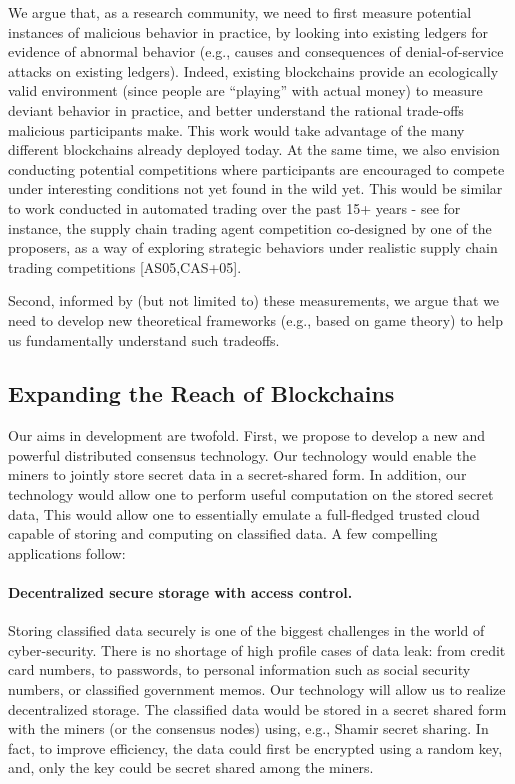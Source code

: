 \documentclass[runningheads, 12pt]{article}
\begin{document}
We argue that, as a research community, we need to first measure potential instances of malicious behavior in practice, by looking into existing ledgers for evidence of abnormal behavior (e.g., causes and consequences of denial-of-service attacks on existing ledgers). Indeed, existing blockchains provide an ecologically valid environment (since people are “playing” with actual money) to measure deviant behavior in practice, and better understand the rational trade-offs malicious participants make. This work would take advantage of the many different blockchains already deployed today. At the same time, we also envision conducting potential competitions where participants are encouraged to compete under interesting conditions not yet found in the wild yet. This would be similar to work conducted in automated trading over the past 15+ years - see for instance, the supply chain trading agent competition co-designed by one of the proposers, as a way of exploring strategic behaviors under realistic supply chain trading competitions [AS05,CAS+05].

Second, informed by (but not limited to) these measurements, we argue that we need to develop new theoretical frameworks (e.g., based on game theory) to help us fundamentally understand such tradeoffs.

\subsection{Expanding the Reach of Blockchains}

Our aims in development are twofold. First, we propose to develop a new and powerful distributed consensus technology. Our technology would enable the miners to jointly store secret data in a secret-shared form.  In addition, our technology would allow one to perform useful computation on the stored secret data, This would allow one to essentially emulate a full-fledged trusted cloud capable of storing and computing on classified data. A few compelling applications follow:

\paragraph{Decentralized secure storage with access control.} Storing classified data securely is one of the biggest challenges in the world of cyber-security. There is no shortage of high profile cases of data leak: from credit card numbers, to passwords, to personal information such as social security numbers, or classified government memos. Our technology will allow us to realize decentralized storage. The classified data would be stored in a secret shared form with the miners (or the consensus nodes) using, e.g., Shamir secret sharing. In fact, to improve efficiency, the data could first be encrypted using a random key, and, only the key could be secret shared among the miners.
\end{document}
